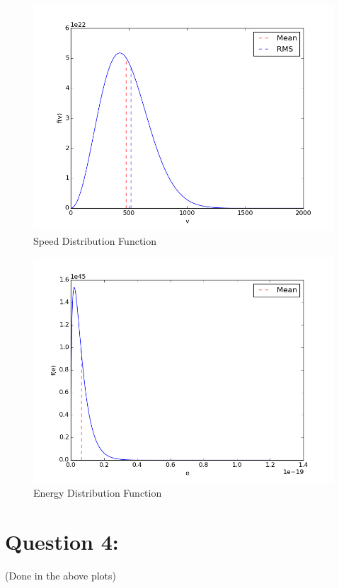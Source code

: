 \documentclass[11pt, a4paper]{article}
\begin{document}
\begin{figure}[H]
 \centering
 \includegraphics[width = \textwidth]{Q3speed.png}
 \caption{Speed Distribution Function}
 \label{fig:speed_pdf}
\end{figure}

\begin{figure}[H]
 \centering
 \includegraphics[width = \textwidth]{Q3energy.png}
 \caption{Energy Distribution Function}
 \label{fig:energy_pdf}
\end{figure}

\section{Question 4:}
(Done in the above plots)
\end{document}
